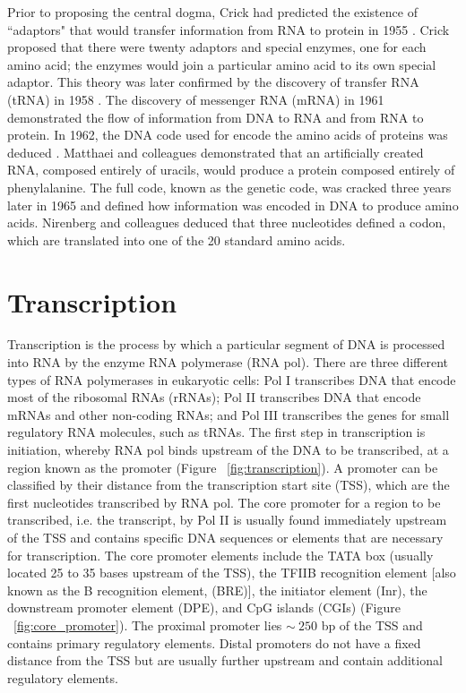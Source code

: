 Prior to proposing the central dogma, Crick had predicted the existence of ``adaptors" that would transfer information from RNA to protein in 1955 \citep{cricktrna1955}. Crick proposed that there were twenty adaptors and special enzymes, one for each amino acid; the enzymes would join a particular amino acid to its own special adaptor. This theory was later confirmed by the discovery of transfer RNA (tRNA) in 1958 \citep{pmid13538965}. The discovery of messenger RNA (mRNA) in 1961  \citep{BRENNER1961} demonstrated the flow of information from DNA to RNA and from RNA to protein. In 1962, the DNA code used for encode the amino acids of proteins was deduced \citep{pmid14471390}. Matthaei and colleagues demonstrated that an artificially created RNA, composed entirely of uracils, would produce a protein composed entirely of phenylalanine. The full code, known as the genetic code, was cracked three years later in 1965 \citep{pmid5330357} and defined how information was encoded in DNA to produce amino acids. Nirenberg and colleagues deduced that three nucleotides defined a codon, which are translated into one of the 20 standard amino acids.

\section{Transcription}

Transcription is the process by which a particular segment of DNA is processed into RNA by the enzyme RNA polymerase (RNA pol). There are three different types of RNA polymerases in eukaryotic cells: Pol I transcribes DNA that encode most of the ribosomal RNAs (rRNAs); Pol II transcribes DNA that encode mRNAs and other non-coding RNAs; and Pol III transcribes the genes for small regulatory RNA molecules, such as tRNAs. The first step in transcription is initiation, whereby RNA pol binds upstream of the DNA to be transcribed, at a region known as the promoter (Figure ~\ref{fig:transcription}). A promoter can be classified by their distance from the transcription start site (TSS), which are the first nucleotides transcribed by RNA pol. The core promoter for a region to be transcribed, i.e. the transcript, by Pol II is usually found immediately upstream of the TSS and contains specific DNA sequences or elements that are necessary for transcription. The core promoter elements include the TATA box (usually located 25 to 35 bases upstream of the TSS), the TFIIB recognition element [also known as the B recognition element, (BRE)], the initiator element (Inr), the downstream promoter element (DPE), and CpG islands (CGIs) (Figure ~\ref{fig:core_promoter}). The proximal promoter lies $\sim~250$ bp of the TSS and contains primary regulatory elements. Distal promoters do not have a fixed distance from the TSS but are usually further upstream and contain additional regulatory elements.

